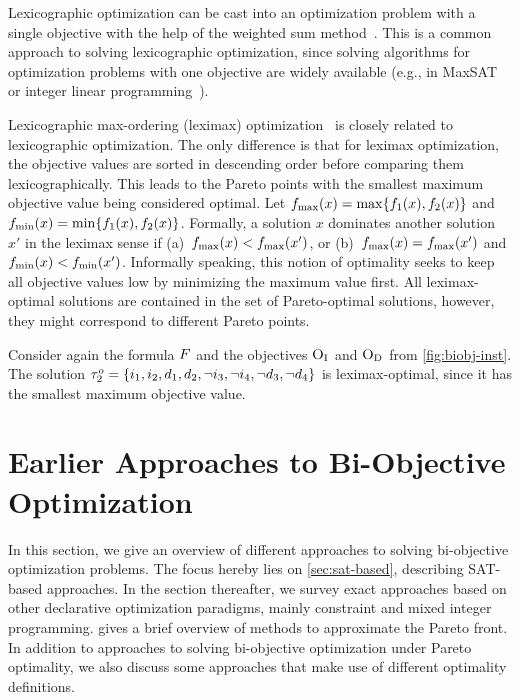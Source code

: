 Lexicographic optimization can be cast into an optimization problem with a single objective with the help of the weighted sum method~\autocite{Ehrgott2005-3}.
This is a common approach to solving lexicographic optimization, since solving algorithms for optimization problems with one objective are widely available (e.g., in MaxSAT~\autocite{handbook2-maxsat} or integer linear programming~\autocite{ChenEtAl2010-intro}).

Lexicographic max-ordering (leximax) optimization~\autocite{Ehrgott2005-5} is closely related to lexicographic optimization.
The only difference is that for leximax optimization, the objective values are sorted in descending order before comparing them lexicographically.
This leads to the Pareto points with the smallest maximum objective value being considered optimal.
Let $f_\text{max}(x) = \max\{f_1(x), f_2(x)\}$ and $f_\text{min}(x) = \min\{f_1(x), f_2(x)\}$.
Formally, a solution $x$ dominates another solution $x'$ in the leximax sense if (a)~$f_\text{max}(x) < f_\text{max}(x')$, or (b)~$f_\text{max}(x) = f_\text{max}(x')$ and $f_\text{min}(x) < f_\text{min}(x')$.
Informally speaking, this notion of optimality seeks to keep all objective values low by minimizing the maximum value first.
All leximax-optimal solutions are contained in the set of Pareto-optimal solutions, however, they might correspond to different Pareto points.

\begin{example}
  Consider again the formula $F$ and the objectives $\textsc{O}_{\text{I}}$ and $\textsc{O}_{\text{D}}$ from \cref{fig:biobj-inst}.
  The solution $\tau^o_2 = \{i_1,\allowbreak i_2,\allowbreak d_1,\allowbreak d_2,\allowbreak \lnot i_3,\allowbreak \lnot i_4,\allowbreak \lnot d_3,\allowbreak \lnot d_4\}$ is leximax-optimal, since it has the smallest maximum objective value.
\end{example}

\section{Earlier Approaches to Bi-Objective Optimization\label{sec:approaches}}

In this section, we give an overview of different approaches to solving bi-objective optimization problems.
The focus hereby lies on \cref{sec:sat-based}, describing SAT-based approaches.
In the section thereafter, we survey exact approaches based on other declarative optimization paradigms, mainly constraint and mixed integer programming.
 gives a brief overview of methods to approximate the Pareto front.
In addition to approaches to solving bi-objective optimization under Pareto optimality, we also discuss some approaches that make use of different optimality definitions.

